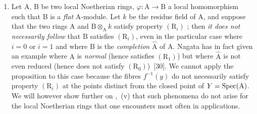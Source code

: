\begin{remarks}[6.5.5]
\label{IV.6.5.5}
\medskip\noindent
\begin{enumerate}[label=(\roman*)]
  \item Let $\mathrm{A}$, $\mathrm{B}$ be two local Noetherian rings, $\varphi:\mathrm{A}\to\mathrm{B}$ a local homomorphism such that $\mathrm{B}$ is a \emph{flat} $\mathrm{A}$-module.
Let $k$ be the residue field of $\mathrm{A}$, and suppose that the two rings $\mathrm{A}$ and $\mathrm{B}\otimes_\mathrm{A} k$ satisfy property $(\mathrm{R}_i)$ ; then \emph{it does not necessarily follow} that $\mathrm{B}$ satisfies $(\mathrm{R}_i)$, even in the particular case where $i=0$ or $i=1$ and where $\mathrm{B}$ is the \emph{completion} $\hat{\mathrm{A}}$ of $\mathrm{A}$.
Nagata has in fact given an example where $\mathrm{A}$ is \emph{normal} (hence satisfies $(\mathrm{R}_1)$) but where $\hat{\mathrm{A}}$ is not even reduced (hence does not satisfy $(\mathrm{R}_0)$)~[30].
We cannot apply the proposition  to this case because the fibres $f^{-1}(y)$ do not necessarily satisfy property $(\mathrm{R}_i)$ at the points distinct from the closed point of $Y=\operatorname{Spec}(\mathrm{A})$.
We will however show further on ,~(v) that such phenomena do not arise for the local Noetherian rings that one encounters most often in applications.


\end{enumerate}
\end{remarks}
